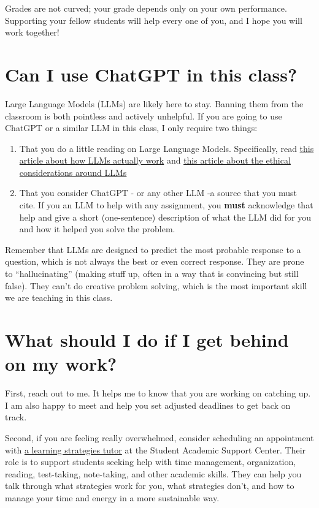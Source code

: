 \documentclass[
  letterpaper,
  DIV=11,
  numbers=noendperiod]{scrartcl}
\begin{document}
Grades are not curved; your grade depends only on your own performance.
Supporting your fellow students will help every one of you, and I hope
you will work together!

\section{Can I use ChatGPT in this class?}\label{ChatGPT}

Large Language Models (LLMs) are likely here to stay. Banning them from
the classroom is both pointless and actively unhelpful. If you are going
to use ChatGPT or a similar LLM in this class, I only require two
things:

\begin{enumerate}
\def\labelenumi{\arabic{enumi}.}
\item
  That you do a little reading on Large Language Models. Specifically,
  read
  \href{https://stackoverflow.blog/2023/07/03/do-large-language-models-know-what-they-are-talking-about/}{this
  article about how LLMs actually work} and
  \href{https://montrealethics.ai/what-lies-behind-agi-ethical-concerns-related-to-llms/}{this
  article about the ethical considerations around LLMs}
\item
  That you consider ChatGPT - or any other LLM -a source that you must
  cite. If you an LLM to help with any assignment, you \textbf{must}
  acknowledge that help and give a short (one-sentence) description of
  what the LLM did for you and how it helped you solve the problem.
\end{enumerate}

Remember that LLMs are designed to predict the most probable response to
a question, which is not always the best or even correct response. They
are prone to ``hallucinating'' (making stuff up, often in a way that is
convincing but still false). They can't do creative problem solving,
which is the most important skill we are teaching in this class.

\section{What should I do if I get behind on my work?}\label{catchingup}

First, reach out to me. It helps me to know that you are working on
catching up. I am also happy to meet and help you set adjusted deadlines
to get back on track.

Second, if you are feeling really overwhelmed, consider scheduling an
appointment with
\href{https://www.bates.edu/student-academic-support-center/learning-strategies/}{a
learning strategies tutor} at the Student Academic Support Center. Their
role is to support students seeking help with time management,
organization, reading, test-taking, note-taking, and other academic
skills. They can help you talk through what strategies work for you,
what strategies don't, and how to manage your time and energy in a more
sustainable way.
\end{document}
